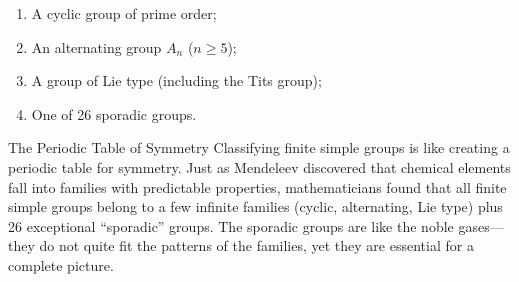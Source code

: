 \begin{enumerate}
\item A cyclic group of prime order;
\item An alternating group $A_n$ ($n \geq 5$);
\item A group of Lie type (including the Tits group);
\item One of 26 sporadic groups.
\end{enumerate}

\begin{analogy}{The Periodic Table of Symmetry}
Classifying finite simple groups is like creating a periodic table for symmetry. Just as Mendeleev discovered that chemical elements fall into families with predictable properties, mathematicians found that all finite simple groups belong to a few infinite families (cyclic, alternating, Lie type) plus 26 exceptional ``sporadic'' groups. The sporadic groups are like the noble gases---they do not quite fit the patterns of the families, yet they are essential for a complete picture.
\end{analogy}

